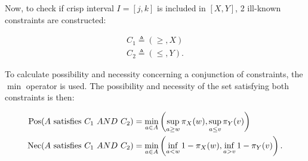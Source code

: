 Now, to check if crisp interval $I = \left[j, k\right]$ is included in $\left[X, Y\right]$, 2 ill-known constraints are constructed:


\vspace{-10pt}

\begin{eqnarray}
C_1\triangleq\left(\geq,X\right)\\
C_2\triangleq\left(\leq,Y\right).
\end{eqnarray}

To calculate possibility and necessity concerning a conjunction of constraints, the $\min$ operator is used. The possibility and necessity of the set satisfying both constraints is then:

\vspace{-10pt}

\begin{align}
\label{eq:interval-pos}
\operatorname{Pos}(A\text{ satisfies }C_1\ AND\ C_2) & = \min_{a \in A}\left(\sup_{a \geq w}\pi_{X}(w),\sup_{a \leq v}\pi_{Y}(v)\right)\\
\label{eq:interval-nec}
\operatorname{Nec}(A\text{ satisfies }C_1\ AND\ C_2) & = \min_{a \in A}\left(\inf_{a < w} 1-\pi_{X}(w),\inf_{a > v} 1-\pi_{Y}(v)\right).
\end{align}

%



